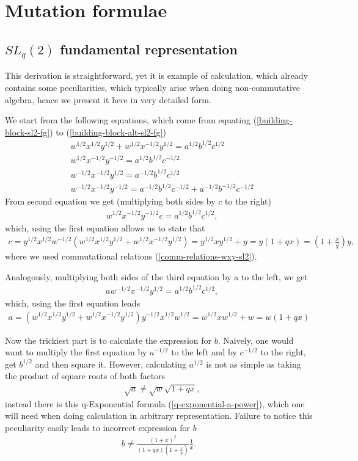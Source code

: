 \documentclass{article}
\newcommand{\lb}{\left (}
\newcommand{\rb}{\right )}
\newcommand{\be}{\begin{eqnarray}}
\newcommand{\ee}{\end{eqnarray}}
\newcommand {\?}{\textit{???}}
\newcommand{\delabel}[1]{(\ref{#1})}
\begin{document}
\section{Mutation formulae}
\subsection{$SL_q(2)$ fundamental representation}
\label{derivation-of-quantum-mutation-sl2}
This derivation is straightforward, yet it is example of calculation,
which already contains some peculiarities, which typically arise when doing non-commutative algebra,
hence we present it here in very detailed form.

We start from the following equations, which come from equating \delabel{building-block-sl2-fg} to \delabel{building-block-alt-sl2-fg}
\be
& w^{1/2}x^{1/2} y^{1/2} + w^{1/2}x^{-1/2}y^{1/2} = a^{1/2}b^{1/2}c^{1/2} \\
& w^{1/2}x^{-1/2}y^{-1/2} = a^{1/2}b^{1/2}c^{-1/2} \\
& w^{-1/2}x^{-1/2}y^{1/2} = a^{-1/2}b^{1/2}c^{1/2} \\
& w^{-1/2}x^{-1/2}y^{-1/2} = a^{-1/2}b^{1/2}c^{-1/2} + a^{-1/2}b^{-1/2}c^{-1/2}
\ee
From second equation we get (multiplying both sides by $c$ to the right)
\be
& w^{1/2}x^{-1/2}y^{-1/2} c = a^{1/2}b^{1/2}c^{1/2},
\ee
which, using the first equation allows us to state that
\be
c = y^{1/2}x^{1/2}w^{-1/2}\lb w^{1/2}x^{1/2}y^{1/2} + w^{1/2}x^{-1/2}y^{1/2} \rb
= y^{1/2} x y^{1/2} + y = y\lb 1 + qx\rb = \lb 1 + \frac{x}{q} \rb y,
\ee
where we used commutational relations \delabel{comm-relations-wxy-sl2}.

Analogously, multiplying both sides of the third equation by a to the left, we get
\be
& a w^{-1/2} x^{-1/2} y^{1/2} = a^{1/2}b^{1/2}c^{1/2},
\ee
which, using the first equation leads
\be
a = \lb w^{1/2}x^{1/2}y^{1/2} + w^{1/2}x^{-1/2}y^{1/2} \rb y^{-1/2}x^{1/2}w^{1/2}
= w^{1/2}x w^{1/2} + w = w \lb 1 + q x \rb
\ee

Now the trickiest part is to calculate the expression for $b$. Naively, one  would want
to multiply the first equation by $a^{-1/2}$ to the left and by $c^{-1/2}$ to the right,
get $b^{1/2}$ and then square it.
However, calculating $a^{1/2}$ is not as simple as taking the product of square roots of both factors
\be
&\sqrt{a} \neq \sqrt{w} \sqrt{1 + q x},
\ee
instead there is this q-Exponential formula \delabel{q-exponential-a-power}, which one will need when
doing calculation in arbitrary representation.
Failure to notice this peculiarity easily leads to incorrect expression for $b$
\be
b \neq \frac{\lb 1 + x\rb^2}{\lb 1 + q x\rb\lb 1 + \frac{x}{q}\rb} \frac{1}{x}.
\ee
\end{document}
